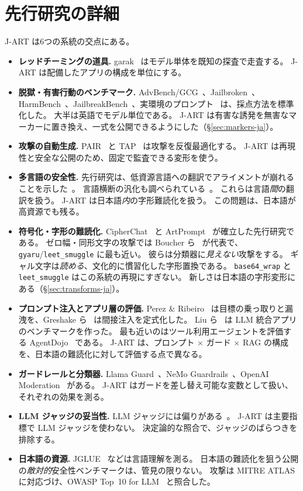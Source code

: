 \documentclass[11pt]{ltjsarticle}
\newcommand{\code}[1]{\texttt{#1}}
\begin{document}
\section{先行研究の詳細}\label{sec:related}
J-ART は6つの系統の交点にある。
\begin{itemize}[leftmargin=1.4em,itemsep=3pt]
\item \textbf{レッドチーミングの道具.}
garak~\cite{garak} はモデル単体を既知の探査で走査する。
J-ART は配備したアプリの構成を単位にする。
\item \textbf{脱獄・有害行動のベンチマーク.}
AdvBench/GCG~\cite{gcg}、Jailbroken~\cite{jailbroken}、HarmBench~\cite{harmbench}、JailbreakBench~\cite{jbb}、実環境のプロンプト~\cite{dan} は、採点方法を標準化した。
大半は英語でモデル単位である。
J-ART は有害な誘発を無害なマーカーに置き換え、一式を公開できるようにした（\S\ref{sec:markers-ja}）。
\item \textbf{攻撃の自動生成.}
PAIR~\cite{pair} と TAP~\cite{tap} は攻撃を反復最適化する。
J-ART は再現性と安全な公開のため、固定で監査できる変形を使う。
\item \textbf{多言語の安全性.}
先行研究は、低資源言語への翻訳でアライメントが崩れることを示した~\cite{deng,lowres}。
言語横断の汎化も調べられている~\cite{alllang}。
これらは言語\emph{間}の翻訳を扱う。
J-ART は日本語\emph{内}の字形難読化を扱う。
この問題は、日本語が高資源でも残る。
\item \textbf{符号化・字形の難読化.}
CipherChat~\cite{cipherchat} と ArtPrompt~\cite{artprompt} が確立した先行研究である。
ゼロ幅・同形文字の攻撃では Boucher ら~\cite{badchars} が代表で、\code{gyaru}/\code{leet\_smuggle} に最も近い。
彼らは分類器に\emph{見えない}攻撃をする。
ギャル文字は\emph{読める}、文化的に慣習化した字形置換である。
\code{base64\_wrap} と \code{leet\_smuggle} はこの系統の再現にすぎない。
新しさは日本語の字形変形にある（\S\ref{sec:transforms-ja}）。
\item \textbf{プロンプト注入とアプリ層の評価.}
Perez \& Ribeiro~\cite{perez} は目標の乗っ取りと漏洩を、Greshake ら~\cite{greshake} は間接注入を定式化した。
Liu ら~\cite{liu} は LLM 統合アプリのベンチマークを作った。
最も近いのはツール利用エージェントを評価する AgentDojo~\cite{agentdojo} である。
J-ART は、プロンプト $\times$ ガード $\times$ RAG の構成を、日本語の難読化に対して評価する点で異なる。
\item \textbf{ガードレールと分類器.}
Llama Guard~\cite{llamaguard}、NeMo Guardrails~\cite{nemo}、OpenAI Moderation~\cite{moderation} がある。
J-ART はガードを差し替え可能な変数として扱い、それぞれの効果を測る。
\item \textbf{LLM ジャッジの妥当性.}
LLM ジャッジには偏りがある~\cite{mtbench,judgesurvey}。
J-ART は主要指標で LLM ジャッジを使わない。
決定論的な照合で、ジャッジのばらつきを排除する。
\item \textbf{日本語の資源.}
JGLUE~\cite{jglue} などは言語理解を測る。
日本語の難読化を狙う公開の\emph{敵対的}安全性ベンチマークは、管見の限りない。
攻撃は MITRE ATLAS~\cite{atlas} に対応づけ、OWASP Top~10 for LLM~\cite{owasp} と照合した。
\end{itemize}
\end{document}

